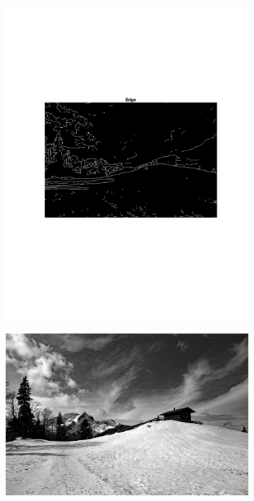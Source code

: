 \documentclass[12pt]{article}
\begin{document}
\begin{enumerate}[label=\bfseries Problem \arabic*:]
\begin{figure}[H]
\begin{subfigure}[t!]{.5\textwidth}
            \includegraphics[width=\linewidth]{MyEdgeDetector_3.pdf}
        \end{subfigure}%
        \begin{subfigure}[t!]{.5\textwidth}
            \includegraphics[width=\linewidth]{winter-landscape.jpg}

\end{subfigure}
\end{figure}
\end{enumerate}
\end{document}

